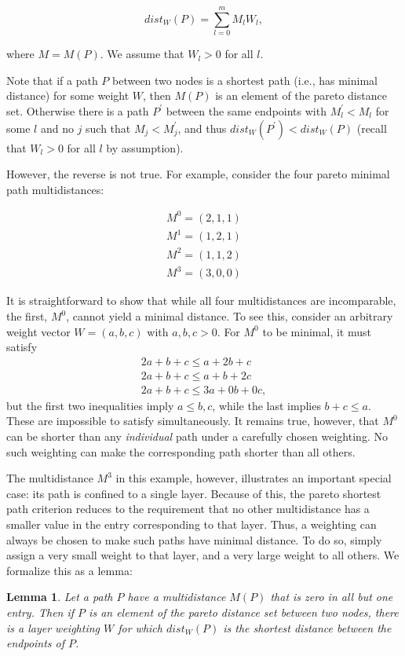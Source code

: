 \documentclass{article}
\newtheorem{lemma}[theorem]{Lemma}
\begin{document}
\[
    dist_W(P)=\sum_{l=0}^{m} M_l W_l,
\]

where $M=M(P)$. We assume that $W_l>0$ for all $l$.

Note that if a path $P$ between two nodes is a shortest path (i.e., has minimal distance) for some
weight $W$, then $M(P)$
is an element of the pareto distance set. Otherwise there is a path $P^\prime$ between the same
endpoints with $M_l^\prime<M_l$ for some $l$ and no $j$ such that $M_j<M_j^\prime$, and thus
$dist_W(P^\prime)<dist_W(P)$  (recall that $W_l>0$ for all $l$ by assumption).

However, the reverse is not true. For example, consider the four pareto minimal path multidistances:

\begin{align*}
    M^0=(2,1,1) \\
    M^1=(1,2,1) \\
    M^2=(1,1,2) \\
    M^3=(3,0,0)
\end{align*}


It is straightforward to show that while all four multidistances are incomparable, the first, $M^0$,
cannot yield a minimal distance. To see this, consider an arbitrary weight vector $W=(a,b,c)$ with
$a,b,c>0$. For $M^0$ to be minimal, it must satisfy
\begin{align*}
    2a+b+c \leq a+2b+c \\
    2a+b+c \leq a+b+2c \\
    2a+b+c \leq 3a+0b+0c,
\end{align*}
but the first two inequalities imply $a\leq b,c$, while the last implies $b+c\leq a$. These are
impossible to satisfy simultaneously. It remains true, however, that $M^0$ can be shorter than any
\emph{individual} path under a carefully chosen weighting. No such weighting can make the corresponding
path shorter than all others.

The multidistance $M^3$ in this example, however, illustrates an important special case: its path
is confined to a single layer. Because of this, the pareto shortest path criterion reduces to the
requirement that no other multidistance has a smaller value in the entry corresponding to that layer.
Thus, a weighting can always be chosen to make such paths have minimal distance. To do so, simply assign a very
small weight to that layer, and a very large weight to all others. We formalize this as a lemma:

\begin{lemma}
    Let a path $P$ have a multidistance $M(P)$ that is zero in all but one entry. Then if $P$ is an
    element of the pareto distance set between two nodes, there is a layer weighting $W$ for which
    $dist_W(P)$ is the shortest distance between the endpoints of $P$.
\end{lemma}
\end{document}

